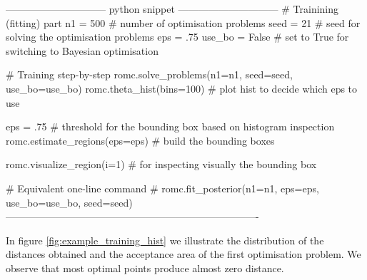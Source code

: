 \begin{Code}
------------------------------ python snippet ------------------------------
  # Trainining (fitting) part
  n1 = 500 # number of optimisation problems
  seed = 21 # seed for solving the optimisation problems
  eps = .75 
  use_bo = False # set to True for switching to Bayesian optimisation

  # Training step-by-step
  romc.solve_problems(n1=n1, seed=seed, use_bo=use_bo)
  romc.theta_hist(bins=100) # plot hist to decide which eps to use

  eps = .75 # threshold for the bounding box based on histogram inspection
  romc.estimate_regions(eps=eps) # build the bounding boxes

  romc.visualize_region(i=1) # for inspecting visually the bounding box

  # Equivalent one-line command
  # romc.fit_posterior(n1=n1, eps=eps, use_bo=use_bo, seed=seed)
----------------------------------------------------------------------------  
\end{Code}

In figure \ref{fig:example_training_hist} we illustrate the
distribution of the distances obtained and the acceptance area of the
first optimisation problem. We observe that most optimal points
produce almost zero distance.



